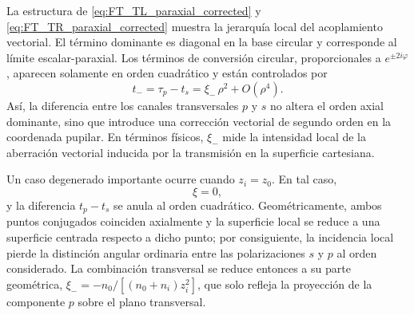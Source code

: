 La estructura de \eqref{eq:FT_TL_paraxial_corrected} y \eqref{eq:FT_TR_paraxial_corrected} muestra la jerarquía local del acoplamiento vectorial. El término dominante es diagonal en la base circular y corresponde al límite escalar-paraxial. Los términos de conversión circular, proporcionales a \(e^{\pm2i\varphi}\), aparecen solamente en orden cuadrático y están controlados por
\begin{equation}
t_-
=
\tau_p-t_s
=
\xi_-\,\rho^2
+
O(\rho^4).
\label{eq:polarization_conversion_quadratic_order}
\end{equation}
Así, la diferencia entre los canales transversales \(p\) y \(s\) no altera el orden axial dominante, sino que introduce una corrección vectorial de segundo orden en la coordenada pupilar. En términos físicos, \(\xi_-\) mide la intensidad local de la aberración vectorial inducida por la transmisión en la superficie cartesiana.

Un caso degenerado importante ocurre cuando \(z_i=z_0\). En tal caso,
\begin{equation}
\xi=0,
\label{eq:xi_zero_equal_conjugates}
\end{equation}
y la diferencia \(t_p-t_s\) se anula al orden cuadrático. Geométricamente, ambos puntos conjugados coinciden axialmente y la superficie local se reduce a una superficie centrada respecto a dicho punto; por consiguiente, la incidencia local pierde la distinción angular ordinaria entre las polarizaciones \(s\) y \(p\) al orden considerado. La combinación transversal se reduce entonces a su parte geométrica, \(\xi_-=-n_0/[(n_0+n_i)z_i^2]\), que solo refleja la proyección de la componente \(p\) sobre el plano transversal.
